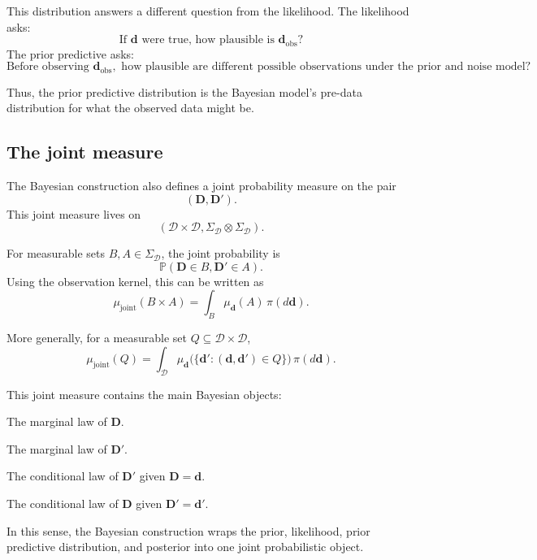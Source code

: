 \documentclass[11pt]{article}
\newcommand{\Dspace}{\mathcal D}
\newcommand{\SigmaD}{\Sigma_{\mathcal D}}
\newcommand{\prior}{\pi}
\newcommand{\Drand}{\mathbf D}
\newcommand{\Dobsrand}{\mathbf D'}
\newcommand{\dobs}{\mathbf d_{\mathrm{obs}}}
\newcommand{\Prob}{\mathbb P}
\begin{document}
This distribution answers a different question from the likelihood. The likelihood asks:
\[
    \text{If } \mathbf d \text{ were true, how plausible is } \dobs?
\]
The prior predictive asks:
\[
    \text{Before observing } \dobs,
    \text{ how plausible are different possible observations under the prior and noise model?}
\]

Thus, the prior predictive distribution is the Bayesian model's pre-data distribution for what the observed data might be.

\subsection{The joint measure}

The Bayesian construction also defines a joint probability measure on the pair
\[
    (\Drand,\Dobsrand).
\]
This joint measure lives on
\[
    (\Dspace\times\Dspace,\SigmaD\otimes\SigmaD).
\]

For measurable sets \(B,A\in\SigmaD\), the joint probability is
\[
    \Prob(\Drand\in B,\Dobsrand\in A).
\]
Using the observation kernel, this can be written as
\[
    \mu_{\mathrm{joint}}(B\times A)
    =
    \int_B
        \mu_{\mathbf d}(A)
    \,\prior(d\mathbf d).
\]

More generally, for a measurable set \(Q\subseteq\Dspace\times\Dspace\),
\[
    \mu_{\mathrm{joint}}(Q)
    =
    \int_{\Dspace}
        \mu_{\mathbf d}
        \bigl(
            \{\mathbf d':(\mathbf d,\mathbf d')\in Q\}
        \bigr)
    \,\prior(d\mathbf d).
\]

This joint measure contains the main Bayesian objects:
\begin{description}[leftmargin=3.1cm,style=nextline]
    \item[Prior.]
    The marginal law of \(\Drand\).

    \item[Prior predictive.]
    The marginal law of \(\Dobsrand\).

    \item[Observation kernel.]
    The conditional law of \(\Dobsrand\) given \(\Drand=\mathbf d\).

    \item[Posterior kernel.]
    The conditional law of \(\Drand\) given \(\Dobsrand=\mathbf d'\).
\end{description}

In this sense, the Bayesian construction wraps the prior, likelihood, prior predictive distribution, and posterior into one joint probabilistic object.
\end{document}
